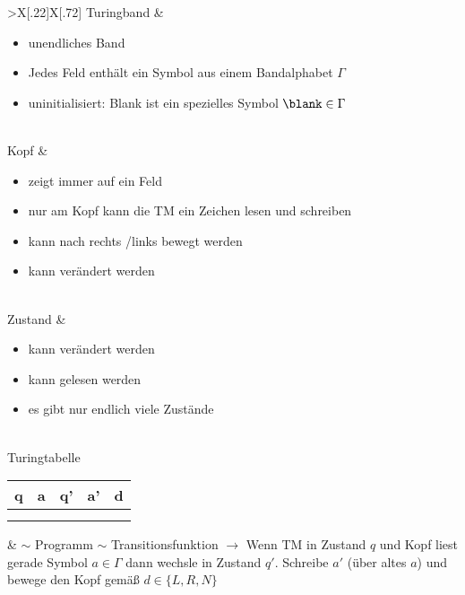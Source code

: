 \begin{tabu}{>{\bfseries}X[.22]X[.72]}
	Turingband & \vspace{-1em}\begin{itemize}[leftmargin=1em,parsep=0pt,topsep=0pt]
	\item unendliches Band
	\item Jedes Feld enthält ein Symbol aus einem Bandalphabet $\Gamma$
	\item uninitialisiert: Blank \blank ist ein spezielles Symbol $\blank\in\Gamma$
	\end{itemize}
	\\
	Kopf & \vspace{-1em}\begin{itemize}[leftmargin=1em,parsep=0pt,topsep=0pt]
	\item zeigt immer auf ein Feld
	\item nur am Kopf kann die \ac{TM} ein Zeichen lesen und schreiben
	\item kann nach rechts /links bewegt werden
	\item kann verändert werden
	\end{itemize}\\
	Zustand & \vspace{-1em}\begin{itemize}[leftmargin=1em,parsep=0pt,topsep=0pt]
	\item kann verändert werden
	\item kann gelesen werden
	\item es gibt nur endlich viele Zustände
	\end{itemize}\\
	Turingtabelle\newline\normalfont
	\begin{tabular}{|*5{c|}}
		q & a & q' & a' & d \\\hline
		&&&&\\
		&&&&
	\end{tabular}
	& $\sim$ Programm $\sim$ Transitionsfunktion \newline
	$\rightarrow$ Wenn \ac{TM} in Zustand $q$ und Kopf liest gerade Symbol $a\in\Gamma$ dann wechsle in Zustand $q'$. Schreibe $a'$ (über altes $a$) und bewege den Kopf gemäß $d\in\{L,R,N\}$
\end{tabu}\

